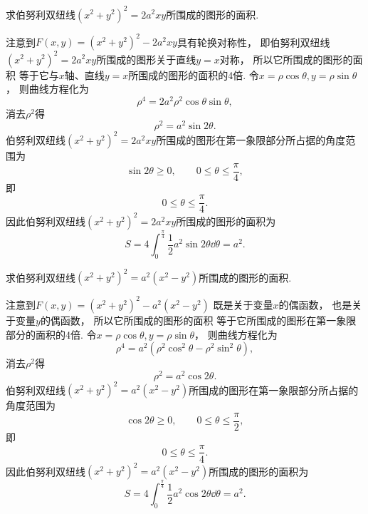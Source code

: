 \begin{example}
求伯努利双纽线\((x^2+y^2)^2 = 2 a^2 x y\)所围成的图形的面积.
\begin{solution}
注意到\(F(x,y) = (x^2+y^2)^2 - 2 a^2 x y\)具有轮换对称性，
即伯努利双纽线\((x^2+y^2)^2 = 2 a^2 x y\)所围成的图形关于直线\(y=x\)对称，
所以它所围成的图形的面积
等于它与\(x\)轴、直线\(y=x\)所围成的图形的面积的4倍.
令\(x = \rho \cos\theta,
y = \rho \sin\theta\)，
则曲线方程化为\begin{equation*}
	\rho^4 = 2 a^2 \rho^2 \cos\theta \sin\theta,
\end{equation*}
消去\(\rho^2\)得\begin{equation*}
	\rho^2 = a^2 \sin2\theta.
\end{equation*}
伯努利双纽线\((x^2+y^2)^2 = 2 a^2 x y\)所围成的图形在第一象限部分所占据的角度范围为\begin{equation*}
	\sin2\theta \geq 0,
	\qquad
	0 \leq \theta \leq \frac\pi4,
\end{equation*}
即\begin{equation*}
	0 \leq \theta \leq \frac\pi4.
\end{equation*}
因此伯努利双纽线\((x^2+y^2)^2 = 2 a^2 x y\)所围成的图形的面积为\begin{equation*}
	S = 4 \int_0^{\frac\pi4} \frac12 a^2 \sin2\theta \dd{\theta}
	= a^2.
\end{equation*}
\end{solution}
\end{example}
\begin{example}
求伯努利双纽线\((x^2+y^2)^2 = a^2(x^2-y^2)\)所围成的图形的面积.
\begin{solution}
注意到\(F(x,y) = (x^2+y^2)^2 - a^2(x^2-y^2)\)
既是关于变量\(x\)的偶函数，
也是关于变量\(y\)的偶函数，
所以它所围成的图形的面积
等于它所围成的图形在第一象限部分的面积的4倍.
令\(x = \rho \cos\theta,
y = \rho \sin\theta\)，
则曲线方程化为\begin{equation*}
	\rho^4 = a^2 (\rho^2 \cos^2\theta - \rho^2 \sin^2\theta),
\end{equation*}
消去\(\rho^2\)得\begin{equation*}
	\rho^2 = a^2 \cos2\theta.
\end{equation*}
伯努利双纽线\((x^2+y^2)^2 = a^2(x^2-y^2)\)所围成的图形在第一象限部分所占据的角度范围为\begin{equation*}
	\cos2\theta \geq 0,
	\qquad
	0 \leq \theta \leq \frac\pi2,
\end{equation*}
即\begin{equation*}
	0 \leq \theta \leq \frac\pi4.
\end{equation*}
因此伯努利双纽线\((x^2+y^2)^2 = a^2(x^2-y^2)\)所围成的图形的面积为\begin{equation*}
	S = 4 \int_0^{\frac\pi4} \frac12 a^2 \cos2\theta \dd{\theta}
	= a^2.
\end{equation*}
\end{solution}
\end{example}

